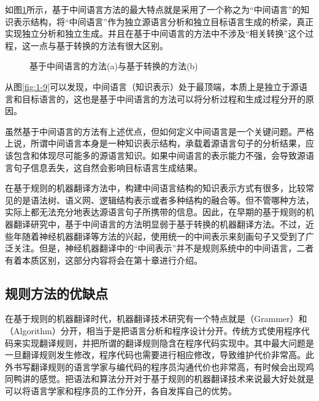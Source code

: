 \parinterval 如图\ref{fig:1-12}所示，基于中间语言方法的最大特点就是采用了一个称之为“中间语言”的知识表示结构，将“中间语言”作为独立源语言分析和独立目标语言生成的桥梁，真正实现独立分析和独立生成。并且在基于中间语言的方法中不涉及“相关转换”这个过程，这一点与基于转换的方法有很大区别。

\begin{figure}[htp]
    \centering

    \caption{基于中间语言的方法(a)与基于转换的方法(b)}
    \label{fig:1-12}
\end{figure}

\parinterval 从图\ref{fig:1-9}可以发现，中间语言（知识表示）处于最顶端，本质上是独立于源语言和目标语言的，这也是基于中间语言的方法可以将分析过程和生成过程分开的原因。

\parinterval 虽然基于中间语言的方法有上述优点，但如何定义中间语言是一个关键问题。严格上说，所谓中间语言本身是一种知识表示结构，承载着源语言句子的分析结果，应该包含和体现尽可能多的源语言知识。如果中间语言的表示能力不强，会导致源语言句子信息丢失，这自然会影响目标语言生成结果。

\parinterval 在基于规则的机器翻译方法中，构建中间语言结构的知识表示方式有很多，比较常见的是语法树、语义网、逻辑结构表示或者多种结构的融合等。但不管哪种方法，实际上都无法充分地表达源语言句子所携带的信息。因此，在早期的基于规则的机器翻译研究中，基于中间语言的方法明显弱于基于转换的机器翻译方法。不过，近些年随着神经机器翻译等方法的兴起，使用统一的中间表示来刻画句子又受到了广泛关注。但是，神经机器翻译中的“中间表示”并不是规则系统中的中间语言，二者有着本质区别，这部分内容将会在第十章进行介绍。


\subsection{规则方法的优缺点}

\parinterval 在基于规则的机器翻译时代，机器翻译技术研究有一个特点就是{\small{}}（Grammer）和{\small{}}（Algorithm）分开，相当于是把语言分析和程序设计分开。传统方式使用程序代码来实现翻译规则，并把所谓的翻译规则隐含在程序代码实现中。其中最大问题是一旦翻译规则发生修改，程序代码也需要进行相应修改，导致维护代价非常高。此外书写翻译规则的语言学家与编代码的程序员沟通代价也非常高，有时候会出现鸡同鸭讲的感觉。把语法和算法分开对于基于规则的机器翻译技术来说最大好处就是可以将语言学家和程序员的工作分开，各自发挥自己的优势。

